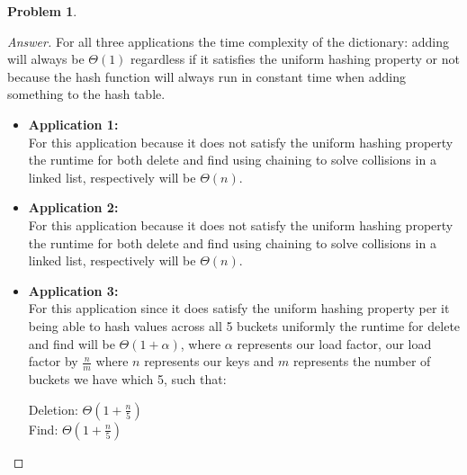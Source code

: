 \documentclass[11pt]{article}
\theoremstyle{definition}
\theoremstyle{definition}
\newtheorem{required}{Problem}
\theoremstyle{definition}
\begin{document}
\begin{required}
\begin{enumerate}[label=(\alph*)]
\begin{proof}[Answer]
For all three applications the time complexity of the dictionary: adding will always be $\Theta(1)$ regardless if it  satisfies the uniform hashing property or not because the hash function will always run in constant time when adding something to the hash table. 
\begin{itemize}
\item \textbf{Application 1:} \\
For this application because it does not satisfy the uniform hashing property the runtime for both delete and find using chaining to solve collisions in a linked list, respectively will be $\Theta(n)$. \\
\item \textbf{Application 2:} \\
For this application because it does not satisfy the uniform hashing property the runtime for both delete and find using chaining to solve collisions in a linked list, respectively will be $\Theta(n)$. \\
\item \textbf{Application 3:} \\
For this application since it does satisfy the uniform hashing property per it being able to hash values across all 5 buckets uniformly the runtime for delete and find will be $\Theta(1 + \alpha)$, where $\alpha$ represents our load factor, our load factor by $\frac{n}{m}$ where $n$ represents our keys and $m$ represents the number of buckets we have which 5, such that: 
\begin{center}
Deletion: $\Theta(1 + \frac{n}{5})$ \\
Find: $\Theta(1 + \frac{n}{5})$ \\
\end{center}

\end{itemize}
\end{proof}

\end{enumerate}
\end{required}





\end{document}
